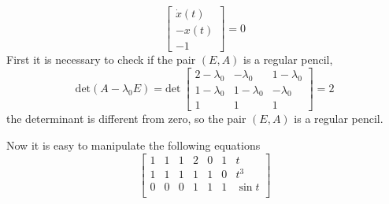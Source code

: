 \begin{example}
\begin{equation}
				\begin{bmatrix}
					\dot{x}(t) \\
					- x(t) \\
					-1 
				\end{bmatrix}
				= 0
			\end{equation}
			First it is necessary to check if the  pair $(E,A)$ is a regular pencil, 
			\begin{equation}
				\textrm{det}(A-\lambda_{0}E) = \textrm{det}~
				\begin{bmatrix}
					2-\lambda_{0} 	&  -\lambda_{0} 	&	  1-\lambda_{0} \\ 
					1-\lambda_{0} 	&  1-\lambda_{0}  	&  -\lambda_{0} \\
					1 				& 1 				& 1
				\end{bmatrix} = 2
			\end{equation}
			the determinant is different from zero, so the pair $(E,A)$ is a regular pencil.
			
			Now it is easy to manipulate the following equations
			\begin{equation}
				\begin{bmatrix}
					1 & 1 & 1 & 2 & 0 & 1 & t\\
					1 & 1 & 1 & 1 & 1 & 0 & t^3\\
					0 & 0 & 0 & 1 & 1 & 1 & \sin{t}\\
				\end{bmatrix}
			\end{equation}
		\end{example}

		